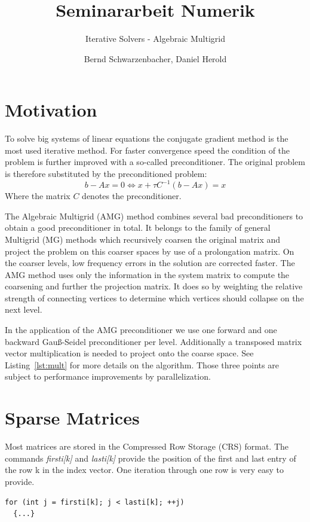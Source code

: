 \documentclass[a4paper,11pt]{scrartcl}
\title{Seminararbeit Numerik}
\subtitle{Iterative Solvers - Algebraic Multigrid}
\author{Bernd Schwarzenbacher, Daniel Herold}
\begin{document}
\maketitle
\tableofcontents
\pagebreak

\section{Motivation} \label{section:motiv}
To solve big systems of linear equations the conjugate gradient method is the
most used iterative method. For faster convergence speed the condition of the
problem is further improved with a so-called preconditioner.
The original problem is therefore substituted by the preconditioned problem:
$$b-Ax = 0 \iff x + \tau C^{-1} (b-Ax) = x$$
Where the matrix $C$ denotes the preconditioner.

The Algebraic Multigrid (AMG) method combines several bad preconditioners to
obtain a good preconditioner in total. It belongs to the family of general
Multigrid (MG) methods which recursively coarsen the original matrix and
project the problem on this coarser spaces by use of a prolongation matrix.
On the coarser levels, low frequency errors in the solution are corrected
faster. The AMG method uses only the information in the system matrix to
compute the coarsening and further the projection matrix. It does so by
weighting the relative strength of connecting vertices to determine which
vertices should collapse on the next level.
\cite{numerik} \cite{numpde}

In the application of the AMG preconditioner we use one forward and one
backward Gauß-Seidel preconditioner per level. Additionally a
transposed matrix vector multiplication is needed to project onto the
coarse space. See Listing~\ref{lst:mult} for more details on the algorithm.
Those three points are subject to performance improvements by parallelization.

\section{Sparse Matrices}
Most matrices are stored in the Compressed Row Storage (CRS) format.
The commands {\em firsti[k]}\/ and {\em lasti[k]}\/ provide the position of the
first and last entry of the row k in the index vector. One
iteration through one row is very easy to provide.

\begin{lstlisting}
for (int j = firsti[k]; j < lasti[k]; ++j)
  {...}
\end{lstlisting}
\end{document}
